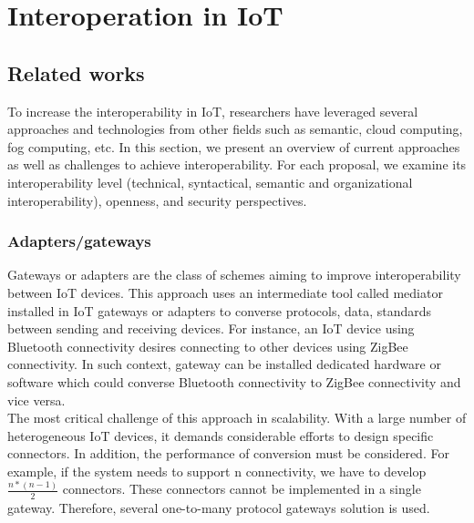 \section{Interoperation in IoT}
\subsection{Related works}

To increase the interoperability in IoT, researchers have leveraged several approaches and technologies from other fields such as semantic, cloud computing, fog computing, etc. In this section, we present an overview of current approaches as well as challenges to achieve interoperability. For each proposal, we examine its interoperability level (technical, syntactical, semantic and organizational interoperability), openness, and security perspectives.

\subsubsection{Adapters/gateways}

Gateways or adapters are the class of schemes aiming to improve interoperability between IoT devices. This approach uses an intermediate tool called mediator installed in IoT gateways or adapters to converse protocols, data, standards between sending and receiving devices. For instance, an IoT device using Bluetooth connectivity desires connecting to other devices using ZigBee connectivity. In such context, gateway can be installed dedicated hardware or software which could converse Bluetooth connectivity to ZigBee connectivity and vice versa.\\

The most critical challenge of this approach in scalability. With a large number of heterogeneous IoT devices, it demands considerable efforts to design specific connectors. In addition, the performance of conversion must be considered. For example, if the system needs to support n connectivity, we have to develop $\frac{n*(n-1)}{2}$ connectors. These connectors cannot be implemented in a single gateway. Therefore, several one-to-many protocol gateways solution is used. \\

